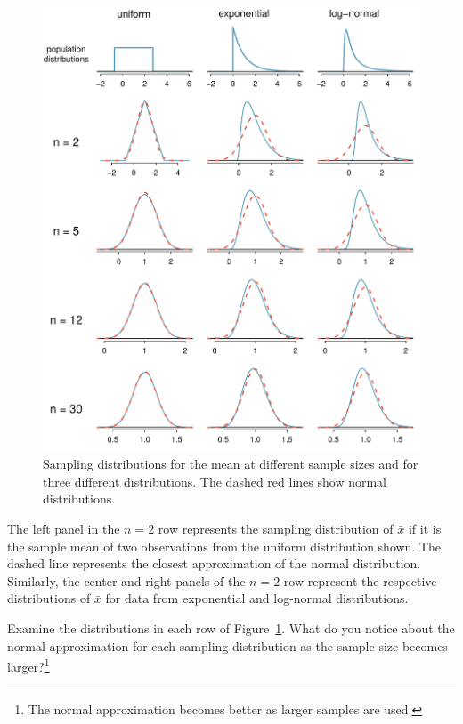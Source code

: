 \begin{figure}
   \centering
   \includegraphics[width=\textwidth]{ch_inference_foundations_oi_biostat/figures/cltSimulations/cltSimulations}
   \caption{Sampling distributions for the mean at different sample sizes and for three different distributions. The dashed red lines show normal distributions.}
   \label{cltSimulations}
\end{figure}

The left panel in the $n=2$ row represents the sampling distribution of $\bar{x}$ if it is the sample mean of two observations from the uniform distribution shown. The dashed line represents the closest approximation of the normal distribution. Similarly, the center and right panels of the $n=2$ row represent the respective distributions of $\bar{x}$ for data from exponential and log-normal distributions.

\begin{exercise}
Examine the distributions in each row of Figure~\ref{cltSimulations}. What do you notice about the normal approximation for each sampling distribution as the sample size becomes larger?\footnote{The normal approximation becomes better as larger samples are used.}
\end{exercise}

